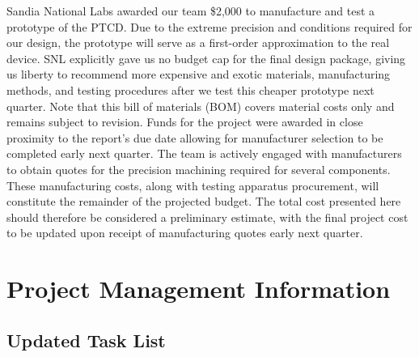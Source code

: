 \documentclass[12pt, letterpaper]{report}%
\newcounter{mycounter}           %
\newcounter{sub}[mycounter]      %
\newcommand{\device}{PTCD}
\begin{document}
    Sandia National Labs awarded our team \$2,000 to manufacture and test a prototype of the \device.
    Due to the extreme precision and conditions required for our design, the prototype will serve as a first-order approximation to the real device.
    SNL explicitly gave us no budget cap for the final design package, giving us liberty to recommend more expensive and exotic materials, manufacturing methods, and testing procedures after we test this cheaper prototype next quarter.
    Note that this bill of materials (BOM) covers material costs only and remains subject to revision. Funds for the project were awarded in close proximity to the report's due date allowing for manufacturer selection to be completed early next quarter. The team is actively engaged with manufacturers to obtain quotes for the precision machining required for several components. 
    These manufacturing costs, along with testing apparatus procurement, will constitute the remainder of the projected budget. The total cost presented here should therefore be considered a preliminary estimate, with the final project 
    cost to be updated upon receipt of manufacturing quotes early next quarter.

    




%
%

\chapter{Project Management Information}
\label{sec:project_management}


\section{Updated Task List}
\label{subsec:task_list}
\end{document}
